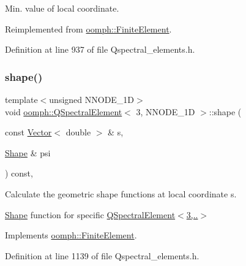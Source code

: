 Min. value of local coordinate. 



Reimplemented from \hyperlink{classoomph_1_1FiniteElement_a35f0803115b68bd162c07de04eeb6c5c}{oomph\+::\+Finite\+Element}.



Definition at line 937 of file Qspectral\+\_\+elements.\+h.

\mbox{\label{classoomph_1_1QSpectralElement_3_013_00_01NNODE__1D_01_4_aa8fddf655c8b460840e1ced82a8e9af7}} 
\subsubsection{\texorpdfstring{shape()}{shape()}}
{\footnotesize\ttfamily template$<$unsigned N\+N\+O\+D\+E\+\_\+1D$>$ \\
void \hyperlink{classoomph_1_1QSpectralElement}{oomph\+::\+Q\+Spectral\+Element}$<$ 3, N\+N\+O\+D\+E\+\_\+1D $>$\+::shape (\begin{DoxyParamCaption}\item[{const \hyperlink{classoomph_1_1Vector}{Vector}$<$ double $>$ \&}]{s,  }\item[{\hyperlink{classoomph_1_1Shape}{Shape} \&}]{psi }\end{DoxyParamCaption}) const\hspace{0.3cm}{\ttfamily [inline]}, {\ttfamily [virtual]}}



Calculate the geometric shape functions at local coordinate s. 

\hyperlink{classoomph_1_1Shape}{Shape} function for specific \hyperlink{classoomph_1_1QSpectralElement_3_013_00_01NNODE__1D_01_4_a16dc807addb7036c30d794d65d2a0b73}{Q\+Spectral\+Element$<$3,..$>$} 

Implements \hyperlink{classoomph_1_1FiniteElement_a58a25b6859ddd43b7bfe64a19fee5023}{oomph\+::\+Finite\+Element}.



Definition at line 1139 of file Qspectral\+\_\+elements.\+h.




